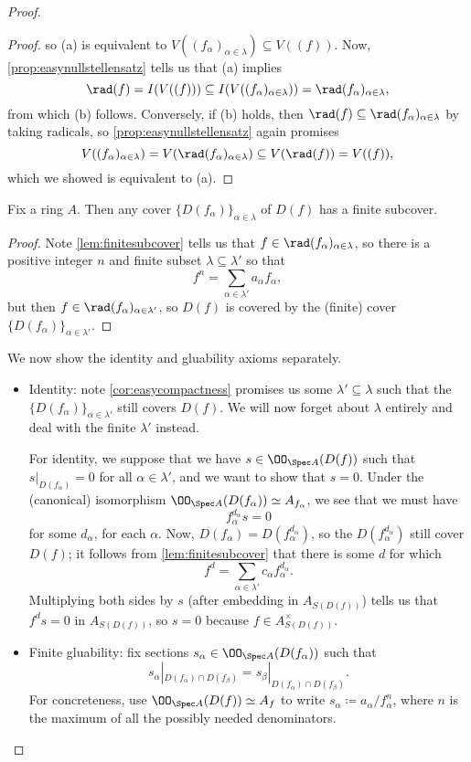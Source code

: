 \documentclass[../notes.tex]{subfiles}
\begin{document}
\begin{proof}
\begin{proof}
		so (a) is equivalent to $V((f_\alpha)_{\alpha\in\lambda})\subseteq V((f))$. Now, \autoref{prop:easynullstellensatz} tells us that (a) implies
		\[\rad(f)=I(V((f)))\subseteq I(V((f_\alpha)_{\alpha\in\lambda}))=\rad(f_\alpha)_{\alpha\in\lambda},\]
		from which (b) follows. Conversely, if (b) holds, then $\rad(f)\subseteq\rad(f_\alpha)_{\alpha\in\lambda}$ by taking radicals, so \autoref{prop:easynullstellensatz} again promises
		\[V((f_\alpha)_{\alpha\in\lambda})=V(\rad(f_\alpha)_{\alpha\in\lambda})\subseteq V(\rad(f))=V((f)),\]
		which we showed is equivalent to (a).
	\end{proof}
	\begin{corollary} \label{cor:easycompactness}
		Fix a ring $A$. Then any cover $\{D(f_\alpha)\}_{\alpha\in\lambda}$ of $D(f)$ has a finite subcover.
	\end{corollary}
	\begin{proof}
		Note \autoref{lem:finitesubcover} tells us that $f\in\rad(f_\alpha)_{\alpha\in\lambda}$, so there is a positive integer $n$ and finite subset $\lambda\subseteq\lambda'$ so that
		\[f^n=\sum_{\alpha\in\lambda'}a_\alpha f_\alpha,\]
		but then $f\in\rad(f_\alpha)_{\alpha\in\lambda'}$, so $D(f)$ is covered by the (finite) cover $\{D(f_\alpha)\}_{\alpha\in\lambda'}$. 
	\end{proof}
	We now show the identity and gluability axioms separately.
	\begin{itemize}
		\item Identity: note \autoref{cor:easycompactness} promises us some $\lambda'\subseteq\lambda$ such that the $\{D(f_\alpha)\}_{\alpha\in\lambda'}$ still covers $D(f)$. We will now forget about $\lambda$ entirely and deal with the finite $\lambda'$ instead.

		For identity, we suppose that we have $s\in\OO_{\Spec A}(D(f))$ such that $s|_{D(f_\alpha)}=0$ for all $\alpha\in\lambda'$, and we want to show that $s=0$. Under the (canonical) isomorphism $\OO_{\Spec A}(D(f_\alpha))\simeq A_{f_\alpha}$, we see that we must have
		\[f_\alpha^{d_\alpha}s=0\]
		for some $d_\alpha$, for each $\alpha$. Now, $D(f_\alpha)=D\left(f_\alpha^{d_\alpha}\right)$, so the $D\left(f_\alpha^{d_\alpha}\right)$ still cover $D(f)$; it follows from \autoref{lem:finitesubcover} that there is some $d$ for which
		\[f^d=\sum_{\alpha\in\lambda'}c_\alpha f_\alpha^{d_\alpha}.\]
		Multiplying both sides by $s$ (after embedding in $A_{S(D(f))}$) tells us that $f^ds=0$ in $A_{S(D(f))}$, so $s=0$ because $f\in A_{S(D(f))}^\times$.

		\item Finite gluability: fix sections $s_\alpha\in\OO_{\Spec A}(D(f_\alpha))$ such that
		\[s_\alpha|_{D(f_\alpha)\cap D(f_\beta)}=s_\beta|_{D(f_\alpha)\cap D(f_\beta)}.\]
		For concreteness, use $\OO_{\Spec A}(D(f))\simeq A_f$ to write $s_\alpha\coloneqq a_\alpha/f_\alpha^n$, where $n$ is the maximum of all the possibly needed denominators.
		

\end{itemize}
\end{proof}
\end{document}

